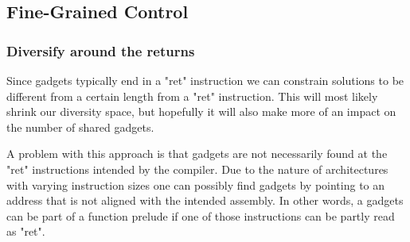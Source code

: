 \subsection{Fine-Grained Control}

\subsubsection{Diversify around the returns}

Since gadgets typically end in a "ret" instruction we can constrain solutions to be different
from a certain length from a "ret" instruction. This will most likely shrink our diversity
space, but hopefully it will also make more of an impact on the number of shared gadgets.

A problem with this approach is that gadgets are not necessarily found at the "ret"
instructions intended by the compiler. Due to the nature of architectures with varying
instruction sizes one can possibly find gadgets by pointing to an address that is not
aligned with the intended assembly. In other words, a gadgets can be part of a function
prelude if one of those instructions can be partly read as "ret".

\subsubsection{}
